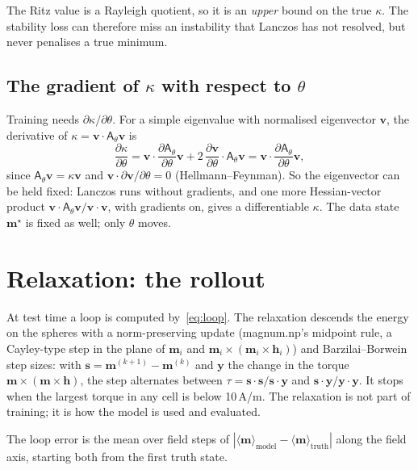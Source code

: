 \documentclass[11pt,a4paper]{article}
\newcommand{\m}{\bm{m}}
\newcommand{\h}{\bm{h}}
\newcommand{\vv}{\bm{v}}
\begin{document}
The Ritz value is a Rayleigh quotient, so it is an \emph{upper} bound on the true $\kappa$. The
stability loss can therefore miss an instability that Lanczos has not resolved, but never penalises a
true minimum.

\subsection{\texorpdfstring{The gradient of $\kappa$ with respect to $\theta$}{The gradient of kappa with respect to theta}}

Training needs $\partial\kappa/\partial\theta$. For a simple eigenvalue with normalised eigenvector
$\vv$, the derivative of $\kappa = \vv\cdot\mathsf{A}_\theta\vv$ is
\begin{equation}
  \frac{\partial\kappa}{\partial\theta}
  = \vv\cdot\frac{\partial\mathsf{A}_\theta}{\partial\theta}\vv
  + 2\,\frac{\partial\vv}{\partial\theta}\cdot\mathsf{A}_\theta\vv
  = \vv\cdot\frac{\partial\mathsf{A}_\theta}{\partial\theta}\vv ,
\end{equation}
since $\mathsf{A}_\theta\vv=\kappa\vv$ and $\vv\cdot\partial\vv/\partial\theta=0$ (Hellmann--Feynman).
So the eigenvector can be held fixed: Lanczos runs without gradients, and one more Hessian-vector product
$\vv\cdot\mathsf{A}_\theta\vv/\vv\cdot\vv$, with gradients on, gives a differentiable $\kappa$. The data
state $\m^\star$ is fixed as well; only $\theta$ moves.

\section{Relaxation: the rollout}

At test time a loop is computed by~\eqref{eq:loop}. The relaxation descends the energy on the spheres
with a norm-preserving update (magnum.np's midpoint rule, a Cayley-type step in the plane of $\m_i$
and $\m_i\times(\m_i\times\h_i)$) and Barzilai--Borwein step sizes: with $\bm s = \m^{(k+1)}-\m^{(k)}$ and
$\bm y$ the change in the torque $\m\times(\m\times\h)$, the step alternates between
$\tau = \bm s\cdot\bm s/\bm s\cdot\bm y$ and $\bm s\cdot\bm y/\bm y\cdot\bm y$. It stops when the largest
torque in any cell is below 10\,A/m. The relaxation is not part of training; it is how the model is
used and evaluated.

The loop error is the mean over field steps of $|\langle\m\rangle_\mathrm{model}-\langle\m\rangle_\mathrm{truth}|$
along the field axis, starting both from the first truth state.
\end{document}
